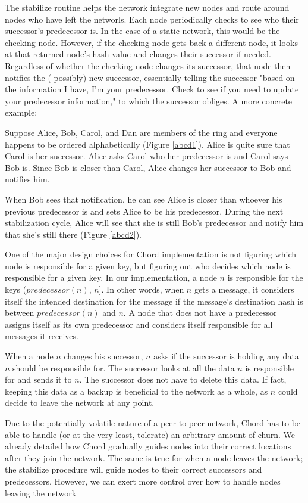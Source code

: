 \documentclass[conference, compsocconf, letterpaper]{IEEEtran}
\begin{document}
The stabilize routine helps the network integrate new nodes and route around nodes who have left the networls. Each node periodically checks to see who their successor's predecessor is.  In the case of a static network, this would be the checking node.  However, if the checking node gets back a different node, it looks at that returned node's hash value and changes their successor if needed.  Regardless of whether the checking node changes its successor, that node then notifies the ( possibly) new successor,  essentially telling the successor "based on the information I have, I'm your predecessor.  Check to see if you need to update your predecessor information," to which the successor obliges.  A more concrete example:


Suppose Alice, Bob, Carol, and Dan are members of the ring and everyone happens to be ordered alphabetically (Figure \ref{abcd1}). Alice is quite sure that Carol is her successor.  Alice asks Carol who her predecessor is and Carol says Bob is.  Since Bob is closer than Carol, Alice changes her successor to Bob and notifies him.  

When Bob sees that notification, he can see Alice is closer than whoever his previous predecessor is and sets Alice to be his predecessor.  During the next stabilization cycle, Alice will see that she is still Bob's predecessor and notify him that she's still there (Figure \ref{abcd2}).

One of the major design choices for Chord implementation is not figuring which node is responsible for a given key, but figuring out who decides which node is responsible for a given key.  In our implementation, a node $n$ is responsible for the keys ($predecessor(n)$, $n$].  In other words, when $n$ gets a message, it considers itself the intended destination for the message if the message's destination hash is between $predecessor(n)$ and $n$.  A node that does not have a predecessor assigns itself as its own predecessor and considers itself responsible for all messages it receives. 

When a node $n$ changes his successor, $n$ asks if the successor is holding any data $n$ should be responsible for.  The successor looks at all the data $n$ is responsible for and sends it  to $n$.  The successor does not have to delete this data. If fact, keeping this data as a backup is beneficial to the network as a whole, as $n$ could decide to leave the network at any point. 

Due to the potentially volatile nature of a peer-to-peer network, Chord has to be able to handle (or at the very least, tolerate) an arbitrary amount of churn.  We already detailed how Chord gradually guides nodes into their correct locations after they join the network.  The same is true for when a node leaves the network; the stabilize procedure will guide nodes to their correct successors and predecessors.  However, we can exert more control over how to handle nodes leaving the network
\end{document}
